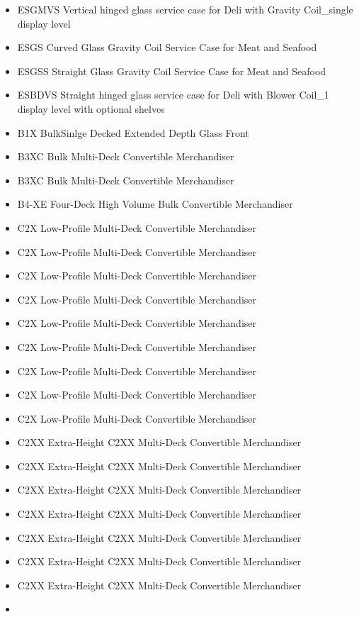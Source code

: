 \begin{itemize}
\item
  ESGMVS Vertical hinged glass service case for Deli with Gravity Coil\_single display level
\item
  ESGS Curved Glass Gravity Coil Service Case for Meat and Seafood
\item
  ESGSS Straight Glass Gravity Coil Service Case for Meat and Seafood
\item
  ESBDVS Straight hinged glass service case for Deli with Blower Coil\_1 display level with optional shelves
\item
  B1X BulkSinlge Decked Extended Depth Glass Front
\item
  B3XC Bulk Multi-Deck Convertible Merchandiser
\item
  B3XC Bulk Multi-Deck Convertible Merchandiser
\item
  B4-XE Four-Deck High Volume Bulk Convertible Merchandiser
\item
  C2X Low-Profile Multi-Deck Convertible Merchandiser
\item
  C2X Low-Profile Multi-Deck Convertible Merchandiser
\item
  C2X Low-Profile Multi-Deck Convertible Merchandiser
\item
  C2X Low-Profile Multi-Deck Convertible Merchandiser
\item
  C2X Low-Profile Multi-Deck Convertible Merchandiser
\item
  C2X Low-Profile Multi-Deck Convertible Merchandiser
\item
  C2X Low-Profile Multi-Deck Convertible Merchandiser
\item
  C2X Low-Profile Multi-Deck Convertible Merchandiser
\item
  C2X Low-Profile Multi-Deck Convertible Merchandiser
\item
  C2XX Extra-Height C2XX Multi-Deck Convertible Merchandiser
\item
  C2XX Extra-Height C2XX Multi-Deck Convertible Merchandiser
\item
  C2XX Extra-Height C2XX Multi-Deck Convertible Merchandiser
\item
  C2XX Extra-Height C2XX Multi-Deck Convertible Merchandiser
\item
  C2XX Extra-Height C2XX Multi-Deck Convertible Merchandiser
\item
  C2XX Extra-Height C2XX Multi-Deck Convertible Merchandiser
\item
  C2XX Extra-Height C2XX Multi-Deck Convertible Merchandiser
\item

\end{itemize}

